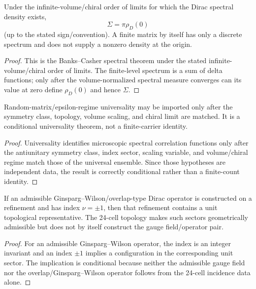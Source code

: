 \documentclass[12pt,a4paper]{article}
\begin{document}


\begin{theorem}
\label{p10:thm:banks-casher-bridge}
Under the infinite-volume/chiral order of limits for which the Dirac spectral density exists,
\begin{equation}
\Sigma=\pi\rho_D(0)
\end{equation}
(up to the stated sign/convention).  A finite matrix by itself has only a discrete spectrum and does not supply a nonzero density at the origin.
\end{theorem}
\begin{proof}
This is the Banks--Casher spectral theorem under the stated
infinite-volume/\allowbreak chiral order of limits.
The finite-level spectrum is a sum of delta functions; only after the
volume-normalized spectral measure converges can its value at zero define
$\rho_D(0)$ and hence $\Sigma$.
\end{proof}

\begin{theorem}
\label{p10:thm:near-zero-dirac-universality}
Random-matrix/epsilon-regime universality may be imported only after the symmetry class, topology, volume scaling, and chiral limit are matched.  It is a conditional universality theorem, not a finite-carrier identity.
\end{theorem}
\begin{proof}
Universality identifies microscopic spectral correlation functions only after the antiunitary symmetry class, index sector, scaling variable, and volume/chiral regime match those of the universal ensemble.  Since those hypotheses are independent data, the result is correctly conditional rather than a finite-count identity.
\end{proof}

\begin{theorem}
\label{p10:thm:unit-topological-representative-finite-carrier}
If an admissible Ginsparg--Wilson/overlap-type Dirac operator is constructed on a refinement and has index \(\nu=\pm1\), then that refinement contains a unit topological representative.  The 24-cell topology makes such sectors geometrically admissible but does not by itself construct the gauge field/operator pair.
\end{theorem}
\begin{proof}
For an admissible Ginsparg--Wilson operator, the index is an integer invariant and an index $\pm1$ implies a configuration in the corresponding unit sector.  The implication is conditional because neither the admissible gauge field nor the overlap/Ginsparg--Wilson operator follows from the 24-cell incidence data alone.
\end{proof}
\end{document}
